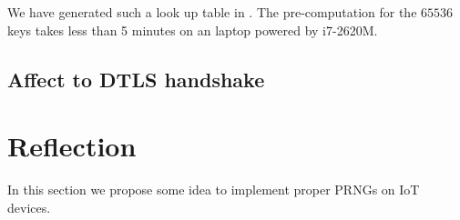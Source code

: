We have generated such a look up table in \cite{prngtest}. The pre-computation for the $65536$ keys takes less than 5 minutes on an laptop powered by i7-2620M. 

\subsection{Affect to DTLS handshake}

\section{Reflection}
In this section we propose some idea to implement proper PRNGs on IoT devices.